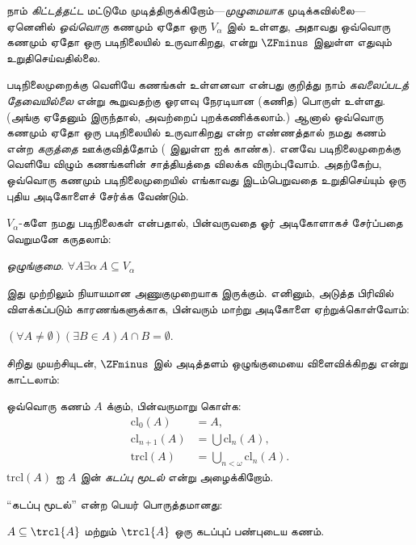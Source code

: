 \documentclass[../../../include/open-logic-section]{subfiles}
\begin{document}


நாம் \emph{கிட்டத்தட்ட} மட்டுமே முடித்திருக்கிறோம்---\emph{முழுமையாக}
முடிக்கவில்லை---ஏனெனில் \emph{ஒவ்வொரு} கணமும் ஏதோ ஒரு $V_\alpha$ இல் உள்ளது,
அதாவது ஒவ்வொரு கணமும் ஏதோ ஒரு படிநிலையில் உருவாகிறது, என்று
$\ZFminus$ இலுள்ள எதுவும் உறுதிசெய்வதில்லை.

படிநிலைமுறைக்கு வெளியே கணங்கள் உள்ளனவா என்பது குறித்து நாம்
\emph{கவலைப்படத் தேவையில்லை} என்று கூறுவதற்கு ஓரளவு நேரடியான (கணித)
பொருள் உள்ளது. (அங்கு ஏதேனும் இருந்தால், அவற்றைப் புறக்கணிக்கலாம்.)
ஆனால் ஒவ்வொரு கணமும் ஏதோ ஒரு படிநிலையில் உருவாகிறது என்ற எண்ணத்தால்
நமது கணம் என்ற \emph{கருத்தை} ஊக்குவித்தோம்
( இலுள்ள \stageshier{} ஐக் காண்க). எனவே
படிநிலைமுறைக்கு வெளியே விழும் கணங்களின் சாத்தியத்தை விலக்க விரும்புவோம்.
அதற்கேற்ப, ஒவ்வொரு கணமும் படிநிலைமுறையில் எங்காவது இடம்பெறுவதை
உறுதிசெய்யும் ஒரு புதிய அடிகோளைச் சேர்க்க வேண்டும்.

$V_\alpha$-களே நமது படிநிலைகள் என்பதால், பின்வருவதை ஓர் அடிகோளாகச்
சேர்ப்பதை வெறுமனே கருதலாம்:

\begin{defish}
\emph{ஒழுங்குமை.} $\forall A \exists \alpha\, A \subseteq V_\alpha$
\end{defish}

இது முற்றிலும் நியாயமான அணுகுமுறையாக இருக்கும். எனினும், அடுத்த பிரிவில்
விளக்கப்படும் காரணங்களுக்காக, பின்வரும் மாற்று அடிகோளை ஏற்றுக்கொள்வோம்:

\begin{axiom}[அடித்தளம்]
$(\forall A \neq \emptyset)(\exists B \in A)A \cap B = \emptyset$.
\end{axiom}

சிறிது முயற்சியுடன், $\ZFminus$ இல் அடித்தளம் ஒழுங்குமையை விளைவிக்கிறது
என்று காட்டலாம்:
\begin{defn}
ஒவ்வொரு கணம் $A$ க்கும், பின்வருமாறு கொள்க:
\begin{align*}
	\text{cl}_0(A) &= A,\\
	\text{cl}_{n+1}(A) &= \bigcup \text{cl}_n(A),\\
	\text{trcl}(A) &= \bigcup_{n < \omega} \text{cl}_{n}(A).
\end{align*}
$\text{trcl}(A)$ ஐ $A$ இன் \emph{கடப்பு மூடல்} என்று அழைக்கிறோம்.
\end{defn}
\noindent
``கடப்பு மூடல்'' என்ற பெயர் பொருத்தமானது:
\begin{prop}
$A \subseteq \trcl{A}$ மற்றும் $\trcl{A}$ ஒரு கடப்புப் பண்புடைய கணம்.
\end{prop}
\end{document}
